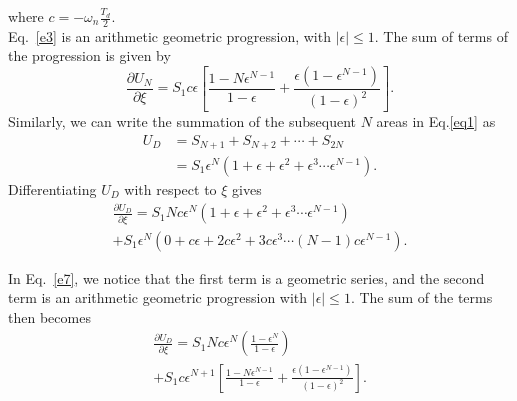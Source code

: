 where $c=-\omega_{n} \frac{T_{d}}{2}$.\\
Eq.~\eqref{e3} is an arithmetic geometric progression, with $\mid \epsilon \mid \leq 1 $. 
The sum of terms of the progression is given by
\begin{equation}
\label{e6}
\frac{\partial U_N}{\partial \xi}=S_{1}c\epsilon\left[\frac{1-N \epsilon^{N-1}}{1-\epsilon}+\frac{\epsilon \left(1-\epsilon^{N-1}\right)}{(1-\epsilon)^{2}}\right].
\end{equation}
Similarly, we can write the summation of the subsequent $N$ areas in Eq.\eqref{eq1} as
\begin{equation}
\begin{aligned}
U_D&=S_{N+1}+S_{N+2}+\cdots+S_{2N}\\
&=S_1 \epsilon^N(1+\epsilon+\epsilon^2+\epsilon^3\cdots\epsilon^{N-1}).
\end{aligned}
\end{equation}
Differentiating $U_D$ with respect to $\xi$ gives
\begin{multline}
\label{e7}
\frac{\partial U_D}{\partial \xi}=S_{1}N c \epsilon^N(1+\epsilon+\epsilon^2+\epsilon^3\cdots\epsilon^{N-1})\\
+S_1 \epsilon^N(0+c\epsilon+2c\epsilon^2+3c\epsilon^3\cdots(N-1)c\epsilon^{N-1}).
\end{multline}

In Eq.~\eqref{e7}, we notice that the first term is a geometric series, and the second term is an arithmetic geometric progression with $\mid \epsilon \mid \leq 1 $. 
The sum of the terms then becomes
\begin{multline}
\label{equd}
\frac{\partial U_D}{\partial \xi}=S_{1}N c \epsilon^N \left(\frac{1-\epsilon^{N}}{1-\epsilon}\right)\\
+S_1c \epsilon^{N+1}\left[\frac{1-N \epsilon^{N-1}}{1-\epsilon}+\frac{\epsilon \left(1-\epsilon^{N-1}\right)}{(1-\epsilon)^{2}}\right].
\end{multline}

